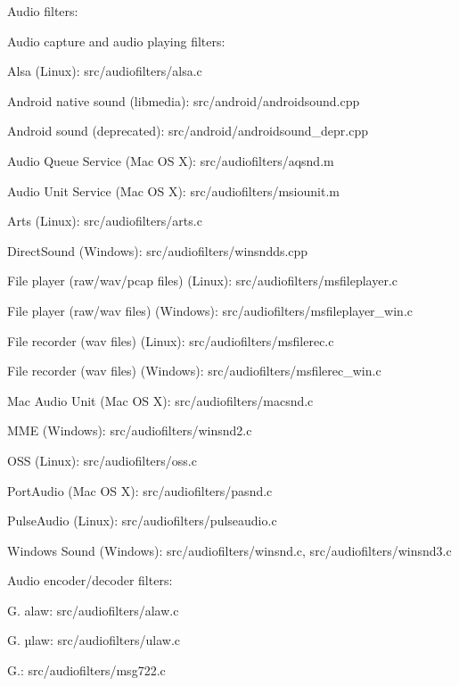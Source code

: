 \begin{DoxyItemize}
\item Audio filters\+:
\begin{DoxyItemize}
\item Audio capture and audio playing filters\+:
\begin{DoxyItemize}
\item Alsa (Linux)\+: src/audiofilters/alsa.\+c
\item Android native sound (libmedia)\+: src/android/androidsound.\+cpp
\item Android sound (deprecated)\+: src/android/androidsound\+\_\+depr.\+cpp
\item Audio Queue Service (Mac OS X)\+: src/audiofilters/aqsnd.\+m
\item Audio Unit Service (Mac OS X)\+: src/audiofilters/msiounit.\+m
\item Arts (Linux)\+: src/audiofilters/arts.\+c
\item Direct\+Sound (Windows)\+: src/audiofilters/winsndds.\+cpp
\item File player (raw/wav/pcap files) (Linux)\+: src/audiofilters/msfileplayer.\+c
\item File player (raw/wav files) (Windows)\+: src/audiofilters/msfileplayer\+\_\+win.\+c
\item File recorder (wav files) (Linux)\+: src/audiofilters/msfilerec.\+c
\item File recorder (wav files) (Windows)\+: src/audiofilters/msfilerec\+\_\+win.\+c
\item Mac Audio Unit (Mac OS X)\+: src/audiofilters/macsnd.\+c
\item M\+ME (Windows)\+: src/audiofilters/winsnd2.\+c
\item O\+SS (Linux)\+: src/audiofilters/oss.\+c
\item Port\+Audio (Mac OS X)\+: src/audiofilters/pasnd.\+c
\item Pulse\+Audio (Linux)\+: src/audiofilters/pulseaudio.\+c
\item Windows Sound (Windows)\+: src/audiofilters/winsnd.\+c, src/audiofilters/winsnd3.\+c
\end{DoxyItemize}
\item Audio encoder/decoder filters\+:
\begin{DoxyItemize}
\item G. alaw\+: src/audiofilters/alaw.\+c
\item G. µlaw\+: src/audiofilters/ulaw.\+c
\item G.\+: src/audiofilters/msg722.\+c

\end{DoxyItemize}
\end{DoxyItemize}
\end{DoxyItemize}
